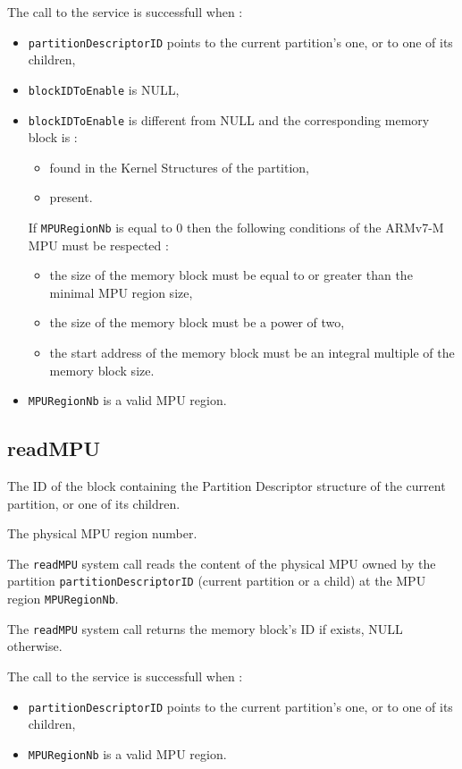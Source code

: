 \documentclass[10pt,a4paper,titlepage]{refart}
\begin{document}
The call to the service is successfull when :
\begin{itemize}
    \item \texttt{partitionDescriptorID} points to the current partition's one, or to one of its children,
    \item \texttt{blockIDToEnable} is NULL,
    \item \texttt{blockIDToEnable} is different from NULL and the corresponding memory block is :
    \begin{itemize}
        \item found in the Kernel Structures of the partition,
        \item present.
    \end{itemize}
    If \texttt{MPURegionNb} is equal to 0 then the following conditions of the ARMv7-M MPU must be respected :
    \begin{itemize}
        \item the size of the memory block must be equal to or greater than the minimal MPU region size,
        \item the size of the memory block must be a power of two,
        \item the start address of the memory block must be an integral multiple of the memory block size.
    \end{itemize}
    \item \texttt{MPURegionNb} is a valid MPU region.
\end{itemize}

\subsection{readMPU}
The ID of the block containing the Partition Descriptor structure of the current partition, or one of its children.

The physical MPU region number.

\medskip
The \texttt{readMPU} system call reads the content of the physical MPU owned by
the partition \texttt{partitionDescriptorID} (current partition or a child) at the MPU region \texttt{MPURegionNb}.

The \texttt{readMPU} system call returns the memory block's ID if exists, NULL otherwise.

The call to the service is successfull when :
\begin{itemize}
    \item \texttt{partitionDescriptorID} points to the current partition's one, or to one of its children,
    \item \texttt{MPURegionNb} is a valid MPU region.
\end{itemize}
\end{document}
